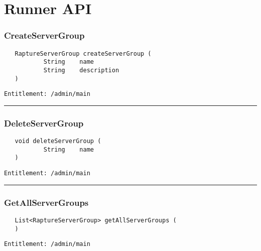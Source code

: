 \chapter{Runner API}

\subsection{CreateServerGroup}
\label{Api:CreateServerGroup}
\begin{verbatim}
   RaptureServerGroup createServerGroup (
           String    name
           String    description
   )
\end{verbatim}
\begin{Verbatim}[fontsize=\small, formatcom=\color{Maroon}]
  Entitlement: /admin/main
\end{Verbatim}



\rule{12cm}{2pt}
\subsection{DeleteServerGroup}
\label{Api:DeleteServerGroup}
\begin{verbatim}
   void deleteServerGroup (
           String    name
   )
\end{verbatim}
\begin{Verbatim}[fontsize=\small, formatcom=\color{Maroon}]
  Entitlement: /admin/main
\end{Verbatim}



\rule{12cm}{2pt}
\subsection{GetAllServerGroups}
\label{Api:GetAllServerGroups}
\begin{verbatim}
   List<RaptureServerGroup> getAllServerGroups (
   )
\end{verbatim}
\begin{Verbatim}[fontsize=\small, formatcom=\color{Maroon}]
  Entitlement: /admin/main
\end{Verbatim}



